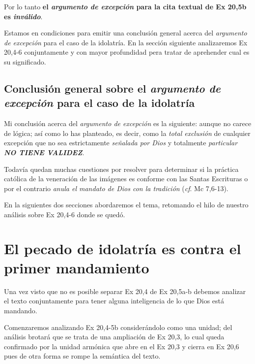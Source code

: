 \documentclass{article}
\begin{document}
Por lo tanto \textbf{el \emph{argumento de excepci\'on} para la cita textual de Ex 20,5b es \emph{inv\'alido}}.

Estamos en condiciones para emitir una conclusi\'on general acerca del \emph{argumento de excepci\'on} para el caso de la idolatr\'{i}a. En la secci\'on siguiente analizaremos Ex 20,4-6 conjuntamente y con mayor profundidad pera tratar de aprehender cual es su significado.

\subsection{Conclusi\'on general sobre el \emph{argumento de excepci\'on} para el caso de la idolatr\'{i}a}

Mi conclusi\'on acerca del \emph{argumento de excepci\'on} es la siguiente: aunque no carece de l\'ogica; as\'{i} como lo has planteado, es decir, como la \emph{total exclusi\'on} de cualquier excepci\'on que no sea estrictamente \emph{se\~nalada por Dios} y totalmente \emph{particular} \textbf{\emph{NO TIENE VALIDEZ}}.



\noindent
Todav\'{i}a quedan muchas cuestiones por resolver para determinar si la pr\'actica cat\'olica de la veneraci\'on de las im\'agenes es conforme con las Santas Escrituras o por el contrario \emph{anula el mandato de Dios con la tradici\'on} (\emph{cf}. Mc 7,6-13).

En la siguientes dos secciones abordaremos el tema, retomando el hilo de nuestro an\'alisis sobre Ex 20,4-6 donde se qued\'o.

\section{El pecado de idolatr\'{i}a es contra el primer mandamiento}

Una vez visto que no es posible separar Ex 20,4 de Ex 20,5a-b debemos analizar el texto conjuntamente para tener alguna inteligencia de lo que Dios est\'a mandando.

Comenzaremos analizando Ex 20,4-5b consider\'andolo como una unidad; del an\'alisis brotar\'a que se trata de una ampliaci\'on de Ex 20,3, lo cual queda confirmado por la unidad arm\'onica que abre en el Ex 20,3 y cierra en Ex 20,6 pues de otra forma se rompe la sem\'antica del texto.
\end{document}
